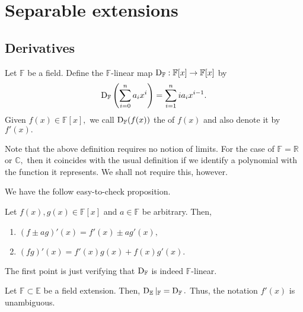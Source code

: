 \chapter{Separable extensions}

\section{Derivatives}

\begin{defn}%
    Let $\mathbb{F}$ be a field. Define the $\mathbb{F}$-linear map $\operatorname{D}_{\mathbb{F}} : \mathbb{F}[x] \to \mathbb{F}[x]$ by
    \begin{equation*} 
        \operatorname{D}_{\mathbb{F}}\left(\sum_{i = 0}^{n} a_ix^i\right) = \sum_{i = 1}^{n}ia_i x^{i - 1}.
    \end{equation*}
    Given $f(x) \in \mathbb{F}[x],$ we call $\operatorname{D}_{\mathbb{F}}(f(x))$ the  of $f(x)$ and also denote it by $f'(x).$
\end{defn}

\begin{rem}
    Note that the above definition requires no notion of limits. For the case of $\mathbb{F} = \mathbb{R}$ or $\mathbb{C},$ then it coincides with the usual definition if we identify a polynomial with the function it represents. We shall not require this, however.
\end{rem}

We have the follow easy-to-check proposition.
\begin{prop}
    Let $f(x), g(x) \in \mathbb{F}[x]$ and $a \in \mathbb{F}$ be arbitrary. Then,
    \begin{enumerate}
        \item $(f \pm ag)'(x) = f'(x) \pm ag'(x),$
        \item $(fg)'(x) = f'(x)g(x) + f(x)g'(x).$
    \end{enumerate}
\end{prop}
The first point is just verifying that $\operatorname{D}_{\mathbb{F}}$ is indeed $\mathbb{F}$-linear.

\begin{prop}
    Let $\mathbb{F} \subset \mathbb{E}$ be a field extension. Then, $\operatorname{D}_{\mathbb{E}}|_{\mathbb{F}} = \operatorname{D}_{\mathbb{F}}.$ Thus, the notation $f'(x)$ is unambiguous.
\end{prop}

